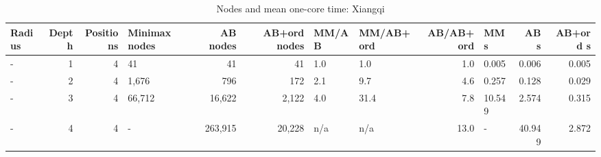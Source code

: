 \begin{table}[!t]
\centering
\caption{Nodes and mean one-core time: Xiangqi}
\label{tab:nodes_xiangqi}
\small
\begin{tabular}{lrrlrrllrlrr}
\toprule
Radius & Depth & Positions & Minimax nodes & AB nodes & AB+ord nodes & MM/AB & MM/AB+ord & AB/AB+ord & MM s & AB s & AB+ord s \\
\midrule
- & 1 & 4 & 41 & 41 & 41 & 1.0 & 1.0 & 1.0 & 0.005 & 0.006 & 0.005 \\
- & 2 & 4 & 1,676 & 796 & 172 & 2.1 & 9.7 & 4.6 & 0.257 & 0.128 & 0.029 \\
- & 3 & 4 & 66,712 & 16,622 & 2,122 & 4.0 & 31.4 & 7.8 & 10.549 & 2.574 & 0.315 \\
- & 4 & 4 & - & 263,915 & 20,228 & n/a & n/a & 13.0 & - & 40.949 & 2.872 \\
\bottomrule
\end{tabular}
\end{table}
